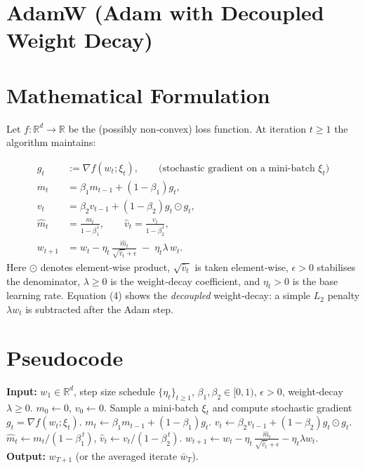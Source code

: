 \documentclass{article}
\newcommand{\RR}{\mathbb{R}}
\begin{document}
\section*{AdamW (Adam with Decoupled Weight Decay)}

\section*{Mathematical Formulation}
Let $f:\RR^{d}\rightarrow\RR$ be the (possibly non‑convex) loss function.  
At iteration $t\ge 1$ the algorithm maintains:

\begin{align}
    g_t &:= \nabla f(w_t; \xi_t), \qquad  \text{(stochastic gradient on a mini‑batch }\xi_t)\\
    m_t &= \beta_1 m_{t-1} + (1-\beta_1) g_t, \tag{1}\\
    v_t &= \beta_2 v_{t-1} + (1-\beta_2) g_t\odot g_t, \tag{2}\\
    \hat m_t &= \frac{m_t}{1-\beta_1^{\,t}},\qquad
    \hat v_t = \frac{v_t}{1-\beta_2^{\,t}}, \tag{3}\\
    w_{t+1} &= w_t - \eta_t\,\frac{\hat m_t}{\sqrt{\hat v_t}+\epsilon}
               \;-\; \eta_t \lambda\, w_t . \tag{4}
\end{align}
Here $\odot$ denotes element‑wise product, $\sqrt{\hat v_t}$ is taken element‑wise, $\epsilon>0$ stabilises the denominator, $\lambda\ge0$ is the weight‑decay coefficient, and $\eta_t>0$ is the base learning rate.  
Equation (4) shows the \emph{decoupled} weight‑decay: a simple $L_2$ penalty $\lambda w_t$ is subtracted after the Adam step.

\section*{Pseudocode}
\begin{algorithm}[H]
\caption{AdamW}
\begin{algorithmic}[1]
\STATE \textbf{Input:} $w_1\in\RR^{d}$, step size schedule $\{\eta_t\}_{t\ge1}$,
          $\beta_1,\beta_2\in[0,1)$, $\epsilon>0$, weight‑decay $\lambda\ge0$.
\STATE $m_0\gets 0$, $v_0\gets 0$.
    \STATE Sample a mini‑batch $\xi_t$ and compute stochastic gradient 
          $g_t=\nabla f(w_t;\xi_t)$.
    \STATE $m_t \gets \beta_1 m_{t-1}+(1-\beta_1)g_t$.
    \STATE $v_t \gets \beta_2 v_{t-1}+(1-\beta_2)g_t\odot g_t$.
    \STATE $\hat m_t \gets m_t/(1-\beta_1^{\,t})$,
          $\hat v_t \gets v_t/(1-\beta_2^{\,t})$.
    \STATE $w_{t+1} \gets w_t - \eta_t\,
            \frac{\hat m_t}{\sqrt{\hat v_t}+\epsilon}
            -\eta_t\lambda w_t$.
\ENDFOR
\STATE \textbf{Output:} $w_{T+1}$ (or the averaged iterate $\bar w_T$).
\end{algorithmic}
\end{algorithm}
\end{document}
